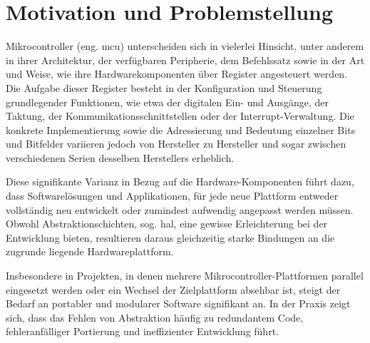 \section{Motivation und Problemstellung}
Mikrocontroller (eng. \gls{mcu}) unterscheiden sich in vielerlei Hinsicht, unter anderem in ihrer Architektur, der verfügbaren Peripherie, dem Befehlssatz sowie in der Art und Weise, wie ihre Hardwarekomponenten über Register angesteuert werden.
Die Aufgabe dieser Register besteht in der Konfiguration und Steuerung grundlegender Funktionen, wie etwa der digitalen Ein- und Ausgänge, der Taktung, der Kommunikationsschnittstellen oder der Interrupt-Verwaltung.
Die konkrete Implementierung sowie die Adressierung und Bedeutung einzelner Bits und Bitfelder variieren jedoch von Hersteller zu Hersteller und sogar zwischen verschiedenen Serien desselben Herstellers erheblich.

Diese signifikante Varianz in Bezug auf die Hardware-Komponenten führt dazu, dass Softwarelösungen und Applikationen, für jede neue Plattform entweder vollständig neu entwickelt oder zumindest aufwendig angepasst werden müssen.
Obwohl Abstraktionschichten, sog. \gls{hal}, eine gewisse Erleichterung bei der Entwicklung bieten, resultieren daraus gleichzeitig starke Bindungen an die zugrunde liegende Hardwareplattform.

Insbesondere in Projekten, in denen mehrere Mikrocontroller-Plattformen parallel eingesetzt werden oder ein Wechsel der Zielplattform absehbar ist, steigt der Bedarf an portabler und modularer Software signifikant an. 
In der Praxis zeigt sich, dass das Fehlen von Abstraktion häufig zu redundantem Code, fehleranfälliger Portierung und ineffizienter Entwicklung führt.

\clearpage

